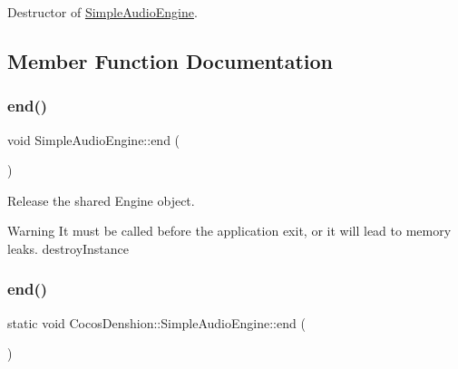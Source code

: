 Destructor of \hyperlink{classCocosDenshion_1_1SimpleAudioEngine}{Simple\+Audio\+Engine}. 

\subsection{Member Function Documentation}
\mbox{\label{classCocosDenshion_1_1SimpleAudioEngine_a2750af49fe41ee3fcf3d544f05ef3c73}} 
\subsubsection{\texorpdfstring{end()}{end()}\hspace{0.1cm}{\footnotesize\ttfamily [1/2]}}
{\footnotesize\ttfamily void Simple\+Audio\+Engine\+::end (\begin{DoxyParamCaption}{ }\end{DoxyParamCaption})\hspace{0.3cm}{\ttfamily [static]}}

Release the shared Engine object.

\begin{DoxyWarning}{Warning}
It must be called before the application exit, or it will lead to memory leaks.  destroy\+Instance 
\end{DoxyWarning}
\mbox{\label{classCocosDenshion_1_1SimpleAudioEngine_a8543d23418a8a299754320929a8ec54b}} 
\subsubsection{\texorpdfstring{end()}{end()}\hspace{0.1cm}{\footnotesize\ttfamily [2/2]}}
{\footnotesize\ttfamily static void Cocos\+Denshion\+::\+Simple\+Audio\+Engine\+::end (\begin{DoxyParamCaption}{ }\end{DoxyParamCaption})\hspace{0.3cm}{\ttfamily [static]}}

